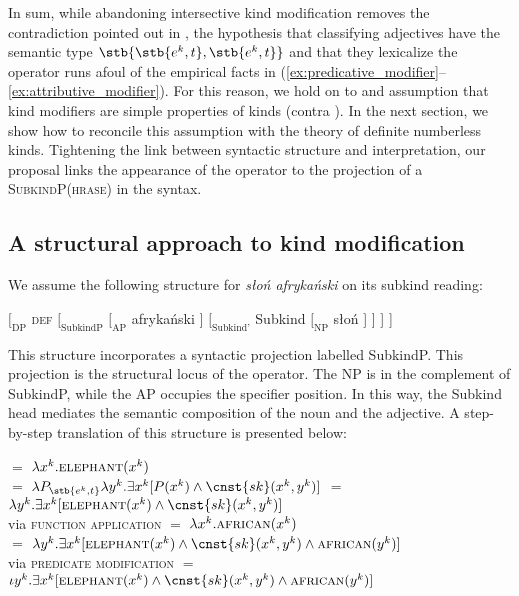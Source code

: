 \documentclass[output=paper]{langscibook}
\begin{document}
In sum, while abandoning intersective kind modification removes the contradiction pointed out in , the hypothesis that classifying adjectives have the semantic type $\stb{\stb{e^k,t},\stb{e^k,t}}$ and that they lexicalize the  operator runs afoul of the empirical facts in (\ref{ex:predicative_modifier}--\ref{ex:attributive_modifier}). For this reason, we hold on to  and  assumption that kind modifiers are simple properties of kinds (contra \citealt{Borik.Espinal2018}). In the next section, we show how to reconcile this assumption with the theory of definite numberless kinds. Tightening the link between syntactic structure and interpretation, our proposal links the appearance of the  operator to the projection of a \textsc{SubkindP(hrase)} in the syntax.

\subsection{A structural approach to kind modification}
\label{sec:structural-approach}

We assume the following structure for \textit{słoń afrykański} on its subkind reading:

\ea $[_\text{DP}$ \textsc{def} $[_\text{SubkindP}$ $[_\text{AP}$ afrykański $]$ $[_\text{Subkind'}$  Subkind $[_\text{NP}$ słoń ] ] ] ]
\label{ex:structure_1}
\z

\noindent
This structure incorporates a syntactic projection labelled SubkindP. This projection is the structural locus of the  operator. The NP is in the complement of SubkindP, while the AP occupies the specifier position. In this way, the Subkind head mediates the semantic composition of the noun and the adjective. A step-by-step translation of this structure is presented below:

\ea
\ea {} $=$ $\lambda x^k.\textsc{elephant}(x^k)$\\
\ex {} $=$ $\lambda P_{\stb{e^k, t}}\lambda y^k.\exists x^k [P(x^k) \wedge \cnst{sk}(x^k, y^k)]$
\ex {} $=$ $\lambda y^k.\exists x^k [\textsc{elephant}(x^k) \wedge \cnst{sk}(x^k, y^k)]$\\
    \hfill via \textsc{function application}
\ex {} $=$ $\lambda x^k.\textsc{african}(x^k)$\\
\ex {} $=$ $\lambda y^k.\exists x^k [\textsc{elephant}(x^k) \wedge \cnst{sk}(x^k, y^k) \wedge \textsc{african}(y^k)]$\\
    \hfill via \textsc{predicate modification}
\ex {} $=$ $\iota y^k.\exists x^k [\textsc{elephant}(x^k) \wedge \cnst{sk}(x^k, y^k) \wedge \textsc{african}(y^k)]$\\
\z \z
\end{document}
